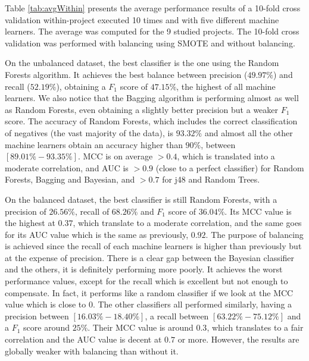 Table \ref{tab:avgWithin} presents the average performance results of a 10-fold cross validation within-project executed 10 times and with five different machine learners. The average was computed for the 9 studied projects. The 10-fold cross validation was performed with balancing using SMOTE and without balancing.

On the unbalanced dataset, the best classifier is the one using the Random Forests algorithm. It achieves the best balance between precision ($49.97\%$) and recall ($52.19\%$), obtaining a $F_{1}$ score of $47.15\%$, the highest of all machine learners. We also notice that the Bagging algorithm is performing almost as well as Random Forests, even obtaining a slightly better precision but a weaker $F_{1}$ score. The accuracy of Random Forests, which includes the correct classification of negatives (the vast majority of the data), is $93.32\%$ and almost all the other machine learners obtain an accuracy higher than $90\%$, between $[89.01\%-93.35\%]$. MCC is on average $>0.4$, which is translated into a moderate correlation, and AUC is $>0.9$ (close to a perfect classifier) for Random Forests, Bagging and Bayesian, and $>0.7$ for j48 and Random Trees.

On the balanced dataset, the best classifier is still Random Forests, with a precision of $26.56\%$, recall of $68.26\%$ and $F_{1}$ score of $36.04\%$. Its MCC value is the highest at $0.37$, which translate to a moderate correlation, and the same goes for its AUC value which is the same as previously, $0.92$. The purpose of balancing is achieved since the recall of each machine learners is higher than previously but at the expense of precision. There is a clear gap between the Bayesian classifier and the others, it is definitely performing more poorly. It achieves the worst performance values, except for the recall which is excellent but not enough to compensate. In fact, it performs like a random classifier if we look at the MCC value which is close to $0$. The other classifiers all performed similarly, having a precision between $[16.03\%-18.40\%]$, a recall between $[63.22\%-75.12\%]$ and a $F_{1}$ score around $25\%$. Their MCC value is around $0.3$, which translates to a fair correlation and the AUC value is decent at $0.7$ or more. However, the results are globally weaker with balancing than without it.

